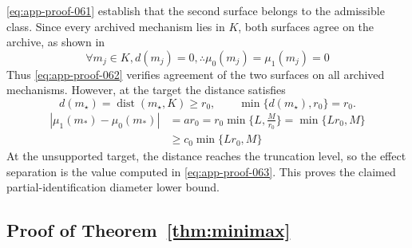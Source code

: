 \documentclass[11pt]{article}
\numberwithin{equation}{section}
\DeclareMathOperator{\dist}{dist}
\newcommand{\1}{\mathbf 1}
\begin{document}
\eqref{eq:app-proof-061} establish that the second surface belongs to the
admissible class.
Since every archived mechanism lies in \(K\), both surfaces agree on the
archive, as shown in
\begin{equation}
\label{eq:app-proof-062}
\forall m_j\in K,d(m_j)=0,\therefore \mu_0(m_j)=\mu_1(m_j)=0
\end{equation}
Thus \eqref{eq:app-proof-062} verifies agreement of the two surfaces on all
archived mechanisms.
However, at the target the distance satisfies
\[
d(m_\star)=\dist(m_\star,K)\ge r_0,
\qquad
\min\{d(m_\star),r_0\}=r_0.
\]
\begin{equation}
\label{eq:app-proof-063}
\begin{aligned}
|\mu_1(m_*)-\mu_0(m_*)|
&=ar_0=r_0\min\{L,\frac{M}{r_0}\}=\min\{Lr_0,M\}\\
&\ge c_0\min\{Lr_0,M\}
\end{aligned}
\end{equation}
At the unsupported target, the distance reaches the truncation level, so the
effect separation is the value computed in \eqref{eq:app-proof-063}.  This
proves the claimed partial-identification diameter lower bound.

\subsection{Proof of Theorem~\ref{thm:minimax}}
\label{app:proof-thm-minimax}
\end{document}
